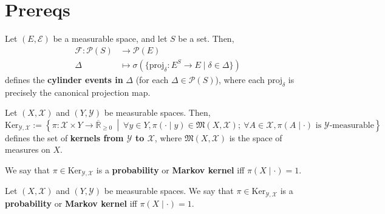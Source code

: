 \chapter{Prereqs}

\begin{definition}
    \label{def:cylinder-event}
    \leanok

    Let $(E,\mathcal{E})$ be a measurable space, and let $S$ be a set. Then,
    \begin{align*}
        \mathcal{F}:\mathcal{P}(S)&\to\mathcal{P}(E)\\
        \Delta&\mapsto \sigma(\{\text{proj}_\delta:E^S\to E\mid \delta\in \Delta\})
    \end{align*}
    defines the \textbf{cylinder events in }$\Delta$ (for each $\Delta\in\mathcal{P}(S)$), where each $\text{proj}_\delta$ is precisely the canonical projection map.
\end{definition}

\begin{definition}[Kernel]
    \label{def:kernel}
    \leanok

    Let $(X,\mathcal{X})$ and $(Y,\mathcal{Y})$ be measurable spaces. Then,
    \begin{equation*}
        \text{Ker}_{\mathcal{Y},\mathcal{X}}:=\left\{\pi:\mathcal{X}\times Y\to\overline{\mathbb{R}}_{\geq0}~\middle\vert~ \forall y\in Y,\pi(\cdot\mid y)\in\mathfrak{M}(X,\mathcal{X});~\forall A\in\mathcal{X},\pi(A\mid\cdot)\text{ is }\mathcal{Y}\text{-measurable}\right\}
    \end{equation*}
    defines the set of \textbf{kernels from $\mathcal{Y}$ to $\mathcal{X}$}, where $\mathfrak{M}(X,\mathcal{X})$ is the space of measures on $X$.

    We say that $\pi\in\text{Ker}_{\mathcal{Y},\mathcal{X}}$ is a \textbf{probability} or \textbf{Markov kernel} iff $\pi(X\mid \cdot)=1$.
\end{definition}

\begin{definition}
    \label{def:markov-kernel}
    \leanok

    Let $(X,\mathcal{X})$ and $(Y,\mathcal{Y})$ be measurable spaces. We say that $\pi\in\text{Ker}_{\mathcal{Y},\mathcal{X}}$ is a \textbf{probability} or \textbf{Markov kernel} iff $\pi(X\mid \cdot)=1$.
\end{definition}

